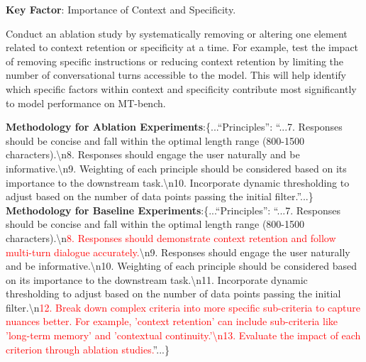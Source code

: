 \documentclass{article} %
\newcommand{\FalsificationAgent}{\textsc{FalsificationAgent}\xspace}
\begin{document}
\begin{tcolorbox}[enhanced, breakable, title={An example of the falsification process from \FalsificationAgent}, colbacktitle=red!55!black, coltitle=white, fonttitle=\bfseries, colframe=red!55!black, colback=white, attach boxed title to top center={yshift=-2mm}, boxed title style = {sharp corners}]
    \begin{tcolorbox}[title={Discovery Candidate}, colbacktitle=red!50!white, fonttitle=\bfseries, colback=red!10!white, boxrule=0pt]
    \textbf{Key Factor}: Importance of Context and Specificity.
    \end{tcolorbox}
    \begin{tcolorbox}[title={Ablation Experiment Plan}, colbacktitle=red!50!white, coltitle=white, fonttitle=\bfseries, colback=red!10!white, boxrule=0pt]
    \small
    Conduct an ablation study by systematically removing or altering one element related to context retention or specificity at a time. For example, test the impact of removing specific instructions or reducing context retention by limiting the number of conversational turns accessible to the model. This will help identify which specific factors within context and specificity contribute most significantly to model performance on MT-bench.
    \end{tcolorbox}
    \begin{tcolorbox}[title={Methodology}, colbacktitle=red!50!white, fonttitle=\bfseries, colback=red!10!white, boxrule=0pt]
    \small
    \textbf{Methodology for Ablation Experiments}:\{...``Principles'': ``...7. Responses should be concise and fall within the optimal length range (800-1500 characters).\textbackslash n8. Responses should engage the user naturally and be informative.\textbackslash n9. Weighting of each principle should be considered based on its importance to the downstream task.\textbackslash n10. Incorporate dynamic thresholding to adjust based on the number of data points passing the initial filter.''...\}
    \tcblower
    \small
    \textbf{Methodology for Baseline Experiments}:\{...``Principles'': ``...7. Responses should be concise and fall within the optimal length range (800-1500 characters).\textbackslash n\textcolor{red}{8. Responses should demonstrate context retention and follow multi-turn dialogue accurately.}\textbackslash n9. Responses should engage the user naturally and be informative.\textbackslash n10. Weighting of each principle should be considered based on its importance to the downstream task.\textbackslash n11. Incorporate dynamic thresholding to adjust based on the number of data points passing the initial filter.\textbackslash n\textcolor{red}{12. Break down complex criteria into more specific sub-criteria to capture nuances better. For example, 'context retention' can include sub-criteria like 'long-term memory' and 'contextual continuity.'\textbackslash n13. Evaluate the impact of each criterion through ablation studies.}''...\} \\ \\

\end{tcolorbox}
\end{tcolorbox}
\end{document}

